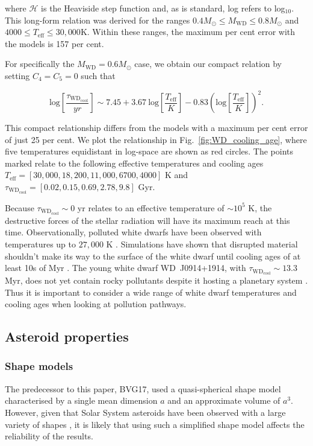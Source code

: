 \documentclass[fleqn,usenatbib]{mnras}
\begin{document}
\noindent{}where $\mathcal{H}$ is the Heaviside step function and, as is standard, log refers to log$_{10}$. This long-form relation was derived for the ranges $0.4M_{\odot} \le M_{\text{WD}} \le 0.8M_{\odot}$ and $4000 \leq T_\text{eff} \leq 30,000$K. Within these ranges, the maximum per cent error with the \cite{Fontaine2001} models is 157 per cent.

For specifically the $M_{\text{WD}} = 0.6M_{\odot}$ case, we obtain our compact relation by setting $C_4=C_5=0$ such that

\begin{equation}
    \text{log} \left[ \frac{\tau_{{\text{WD}}_{\text{cool}}}}{yr} \right] \sim 7.45 + 3.67 \:  \text{log} \left[ \frac{T_\text{eff}}{K} \right] - 0.83 \left( \text{log} \left[ \frac{T_\text{eff}}{K} \right] \right)^2.     \label{eq:cooling_age_approx}
\end{equation}

This compact relationship differs from the \cite{Fontaine2001} models with a maximum per cent error of just 25 per cent. We plot the relationship in Fig.~\ref{fig:WD_cooling_age}, where five temperatures equidistant in log-space are shown as red circles.
The points marked relate to the following effective temperatures and cooling ages $T_\text{eff} = [30,000, 18,200, 11,000, 6700, 4000]$ K and $\tau_{\text{WD}_\text{cool}} = [0.02, 0.15, 0.69, 2.78, 9.8]$ Gyr. 

Because $\tau_{{\text{WD}}_{\text{cool}}} \sim 0$ yr relates to an effective temperature of $\sim 10^5$ K, the destructive forces of the stellar radiation will have its maximum reach at this time. Observationally,  polluted white dwarfs have been observed with temperatures up to $27,000$ K \citep{Koester2014}.
Simulations have shown that disrupted material shouldn't make its way to the surface of the white dwarf until cooling ages of at least 10s of Myr \citep{Mustill2018}. The young white dwarf WD~J0914+1914, with $\tau_{{\text{WD}}_{\text{cool}}} \sim 13.3$ Myr, does not yet contain rocky pollutants despite it hosting a planetary system \citep{Gansicke2019}.
Thus it is important to consider a wide range of white dwarf temperatures and cooling ages when looking  at pollution pathways. 


\subsection{Asteroid properties} \label{subsec:asteroid_props}

\subsubsection{Shape models} \label{subsubsec:shape_models}
The predecessor to this paper, BVG17, used a quasi-spherical shape model characterised by a single mean dimension $a$ and an approximate volume of $a^3$. 
However, given that Solar System asteroids have been observed with a large variety of shapes \citep{Warner2009, Durech2018}, it is likely that using such a simplified shape model affects the reliability of the results.
\end{document}
